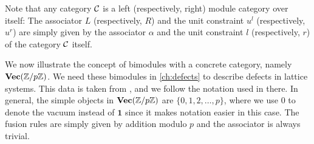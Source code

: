 \begin{rem}
	Note that any category ${\mathcal{C}}$ is a left (respectively, right) module category over itself: The associator $L$ (respectively, $R$) and the unit constraint $u^l$ (respectively, $u^r$) are simply given by the associator $\alpha$ and the unit constraint $l$ (respectively, $r$) of the category ${\mathcal{C}}$ itself.
\end{rem}

\begin{exmp}
	\label{ex:Vecbimod}
	We now illustrate the concept of bimodules with a concrete category, namely $\mathbf{Vec}(\mathbb{Z}/p\mathbb{Z})$. We need these bimodules in \cref{ch:defects} to describe defects in lattice systems. This data is taken from \cite{barter_domain_2019}, and we follow the notation used in there. In general, the simple objects in $\mathbf{Vec}(\mathbb{Z}/p\mathbb{Z})$ are $\{0,1,2,\dots,p\}$, where we use $0$ to denote the vacuum instead of $\mathbf{1}$ since it makes notation easier in this case. The fusion rules are simply given by addition modulo $p$ and the associator is always trivial.
	

\end{exmp}
